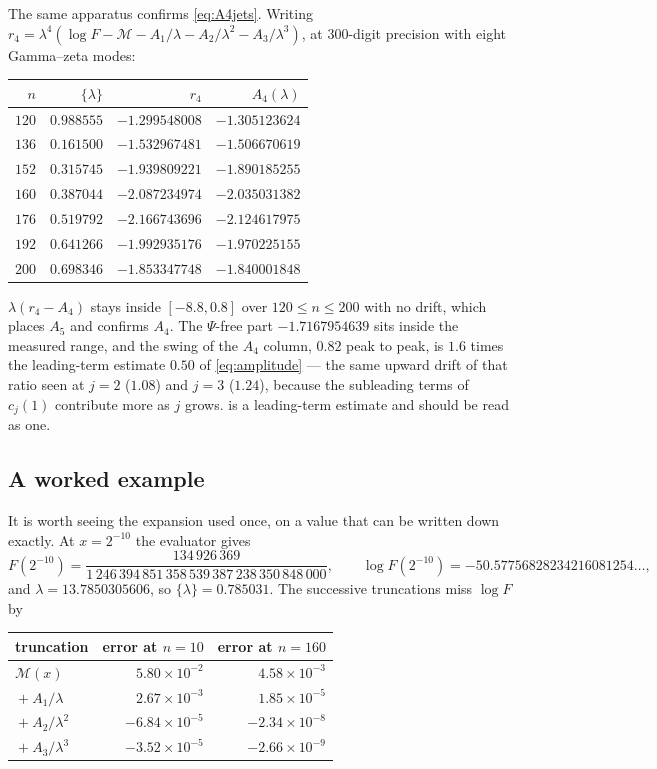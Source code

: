 \documentclass[11pt,oneside]{article}
\theoremstyle{definition}
\theoremstyle{remark}
\begin{document}
The same apparatus confirms \cref{eq:A4jets}.  Writing
$r_4=\lambda^4(\log F-\mathcal M-A_1/\lambda-A_2/\lambda^2-A_3/\lambda^3)$,
at $300$-digit precision with eight Gamma--zeta modes:

\begin{center}\small
\begin{tabular}{@{}rrrr@{}}
\toprule
$n$ & $\{\lambda\}$ & $r_4$ & $A_4(\lambda)$\\
\midrule
$120$ & $0.988555$ & $-1.299548008$ & $-1.305123624$\\
$136$ & $0.161500$ & $-1.532967481$ & $-1.506670619$\\
$152$ & $0.315745$ & $-1.939809221$ & $-1.890185255$\\
$160$ & $0.387044$ & $-2.087234974$ & $-2.035031382$\\
$176$ & $0.519792$ & $-2.166743696$ & $-2.124617975$\\
$192$ & $0.641266$ & $-1.992935176$ & $-1.970225155$\\
$200$ & $0.698346$ & $-1.853347748$ & $-1.840001848$\\
\bottomrule
\end{tabular}
\end{center}

$\lambda(r_4-A_4)$ stays inside $[-8.8,0.8]$ over $120\le n\le200$ with no
drift, which places $A_5$ and confirms $A_4$.  The $\Psi$-free part
$-1.7167954639$ sits inside the measured range, and the swing of the
$A_4$ column, $0.82$ peak to peak, is $1.6$ times the leading-term estimate
$0.50$ of \cref{eq:amplitude} --- the same upward drift of that ratio seen
at $j=2$ ($1.08$) and $j=3$ ($1.24$), because the subleading terms of
$c_j(1)$ contribute more as $j$ grows.   is a
leading-term estimate and should be read as one.

\subsection{A worked example}\label{sec:worked}

It is worth seeing the expansion used once, on a value that can be written
down exactly.  At $x=2^{-10}$ the evaluator gives
\[
  F(2^{-10})=\frac{134\,926\,369}{1\,246\,394\,851\,358\,539\,387\,238\,350\,848\,000},
  \qquad \log F(2^{-10})=-50.57756828234216081254\dots,
\]
and $\lambda=13.7850305606$, so $\{\lambda\}=0.785031$.  The successive
truncations miss $\log F$ by

\begin{center}\small
\begin{tabular}{@{}lrr@{}}
\toprule
truncation & error at $n=10$ & error at $n=160$\\
\midrule
$\mathcal M(x)$ & $5.80\times10^{-2}$ & $4.58\times10^{-3}$\\
${}+A_1/\lambda$ & $2.67\times10^{-3}$ & $1.85\times10^{-5}$\\
${}+A_2/\lambda^2$ & $-6.84\times10^{-5}$ & $-2.34\times10^{-8}$\\
${}+A_3/\lambda^3$ & $-3.52\times10^{-5}$ & $-2.66\times10^{-9}$\\
\bottomrule
\end{tabular}
\end{center}
\end{document}
